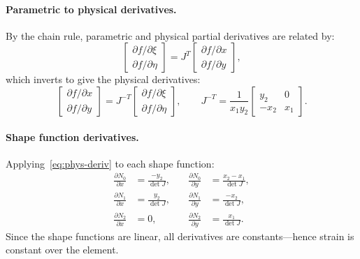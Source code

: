 \paragraph{Parametric to physical derivatives.}
By the chain rule, parametric and physical partial derivatives are related by:
\begin{equation}
  \begin{bmatrix} \partial f / \partial \xi \\ \partial f / \partial \eta \end{bmatrix}
  = J^T
  \begin{bmatrix} \partial f / \partial x \\ \partial f / \partial y \end{bmatrix},
\end{equation}
which inverts to give the physical derivatives:
\begin{equation}\label{eq:phys-deriv}
  \begin{bmatrix} \partial f / \partial x \\ \partial f / \partial y \end{bmatrix}
  = J^{-T}
  \begin{bmatrix} \partial f / \partial \xi \\ \partial f / \partial \eta \end{bmatrix},
  \qquad
  J^{-T} = \frac{1}{x_1 y_2}
  \begin{bmatrix}
    y_2  & 0   \\
    -x_2 & x_1
  \end{bmatrix}.
\end{equation}

\paragraph{Shape function derivatives.}
Applying~\eqref{eq:phys-deriv} to each shape function:
\begin{equation}
  \begin{aligned}
    \frac{\partial N_0}{\partial x} &= \frac{-y_2}{\det J}, &\quad
    \frac{\partial N_0}{\partial y} &= \frac{x_2 - x_1}{\det J}, \\[4pt]
    \frac{\partial N_1}{\partial x} &= \frac{y_2}{\det J}, &\quad
    \frac{\partial N_1}{\partial y} &= \frac{-x_2}{\det J}, \\[4pt]
    \frac{\partial N_2}{\partial x} &= 0, &\quad
    \frac{\partial N_2}{\partial y} &= \frac{x_1}{\det J}.
  \end{aligned}
\end{equation}
Since the shape functions are linear, all derivatives are constants---hence strain is constant over the element.

